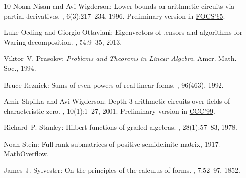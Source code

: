 \documentclass[11pt]{article}
\numberwithin{equation}{section}
\theoremstyle{definition}
\theoremstyle{plain}
\begin{document}
\begin{thebibliography}{10}
{\sc Noam Nisan and Avi Wigderson}: {Lower bounds on arithmetic circuits via
  partial derivatives}.
, 6(3):217--234, 1996.
\newblock Preliminary version in
  \href{https://ieeexplore.ieee.org/document/492458}{FOCS'95}.
\newblock [\epfmtdoi{10.1007/BF01294256}]

{\sc Luke Oeding and Giorgio Ottaviani}: {Eigenvectors of tensors and
  algorithms for {W}aring decomposition}.
, 54:9--35, 2013.

{\sc Viktor~V. Prasolov}: {\em {Problems and Theorems in Linear Algebra}}.
\newblock Amer. Math. Soc., 1994.

{\sc Bruce Reznick}: {Sums of even powers of real linear forms}.
, 96(463), 1992.

{\sc Amir Shpilka and Avi Wigderson}: Depth-3 arithmetic circuits over fields
  of characteristic zero.
, 10(1):1--27, 2001.
\newblock Preliminary version in
  \href{http://dx.doi.org/10.1109/CCC.1999.766267}{CCC'99}.
\newblock [\epfmtdoi{10.1007/PL00001609}]

{\sc Richard~P. Stanley}: {Hilbert functions of graded algebras}.
, 28(1):57--83, 1978.
\newblock [\epfmtdoi{10.1016/0001-8708(78)90045-2}]

{\sc Noah Stein}: Full rank submatrices of positive semidefinite matrix, 1917.
\newblock \href{https://mathoverflow.net/q/266847}{MathOverflow}.

{\sc James~J. Sylvester}: On the principles of the calculus of forms.
, 7:52--97, 1852.

\end{thebibliography}
\end{document}
